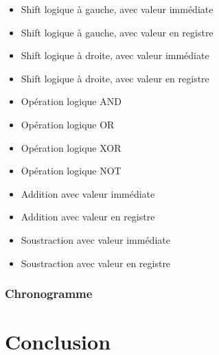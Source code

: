 \documentclass[a4paper]{article} %
\begin{document}
\begin{itemize}
    \item Shift logique à gauche, avec valeur immédiate
    \item Shift logique à gauche, avec valeur en registre
    \item Shift logique à droite, avec valeur immédiate
    \item Shift logique à droite, avec valeur en registre
    \item Opération logique AND
    \item Opération logique OR
    \item Opération logique XOR
    \item Opération logique NOT
    \item Addition avec valeur immédiate
    \item Addition avec valeur en registre
    \item Soustraction avec valeur immédiate
    \item Soustraction avec valeur en registre
\end{itemize}
\subsubsection{Chronogramme}
\section{Conclusion}
\end{document}
